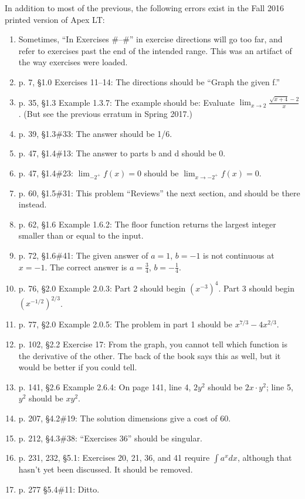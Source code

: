 \documentclass{amsart}
\newcommand{\ds}{\displaystyle}
\begin{document}
In addition to most of the previous, the following errors exist in the Fall 2016 printed version of Apex LT:
\begin{enumerate}
\item Sometimes, ``In Exercises \#--\#'' in exercise directions will go too far, and refer to exercises past the end of the intended range. This was an artifact of the way exercises were loaded.
\item p. 7, \S1.0 Exercises 11--14: The directions should be ``Graph the given f.''
\item p. 35, \S1.3 Example 1.3.7: The example should be: Evaluate $\ds\lim_{x\to2}\frac{\sqrt{x+4}-2}x$. (But see the previous erratum in Spring 2017.)
\item p. 39, \S1.3\#33: The answer should be 1/6.
\item p. 47, \S1.4\#13: The answer to parts b and d should be 0.
\item p. 47, \S1.4\#23: $\ds\lim_{-2^+}f(x)=0$ should be $\ds\lim_{x\to-2^+}f(x)=0$.
\item p. 60, \S1.5\#31: This problem ``Reviews'' the next section, and should be there instead.
\item p. 62, \S1.6 Example 1.6.2: The floor function returns the largest integer smaller than or equal to the input.
\item p. 72, \S1.6\#41: The given answer of $a=1$, $b=-1$ is not continuous at $x=-1$. The correct answer is $a=\frac34$, $b=-\frac14$.
\item p. 76, \S2.0 Example 2.0.3: Part 2 should begin $(x^{-3})^4$. Part 3 should begin $(x^{-1/2})^{2/3}$.
\item p. 77, \S2.0 Example 2.0.5: The problem in part 1 should be $x^{7/3}-4x^{2/3}$.
\item p. 102, \S2.2 Exercise 17: From the graph, you cannot tell which function is the derivative of the other. The back of the book says this as well, but it would be better if you could tell.
\item p. 141, \S2.6 Example 2.6.4: On page 141, line 4, $2y^2$ should be $2x\cdot y^2$; line 5, $y^2$ should be $xy^2$.
\item p. 207, \S4.2\#19: The solution dimensions give a cost of 60.
\item p. 212, \S4.3\#38: ``Exercises 36'' should be singular.
\item p. 231, 232, \S5.1: Exercises 20, 21, 36, and 41 require $\int a^x dx$, although that hasn't yet been discussed. It should be removed.
\item p. 277 \S5.4\#11: Ditto.

\end{enumerate}
\end{document}
